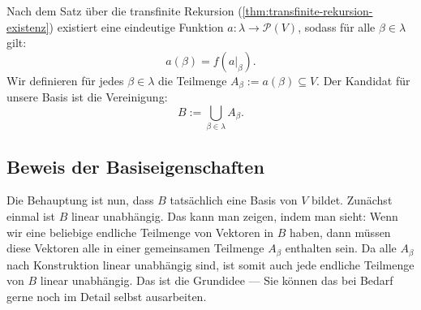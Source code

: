 \begin{math-stroke}
Nach dem Satz über die transfinite Rekursion (\cref{thm:transfinite-rekursion-existenz}) existiert eine eindeutige Funktion $a \colon \lambda \to \mathcal{P}(V)$, sodass für alle $\beta \in \lambda$ gilt:
\[
a(\beta) = f(a|_{\beta}).
\]
Wir definieren für jedes $\beta \in \lambda$ die Teilmenge $A_\beta := a(\beta) \subseteq V$. Der Kandidat für unsere Basis ist die Vereinigung:
\begin{equation}\label{eq:basis-kandidat-actual}
B := \bigcup_{\beta \in \lambda} A_\beta.
\end{equation}
\end{math-stroke}

\subsection{Beweis der Basiseigenschaften}
\begin{spoken-clean}[00:48:05 - 00:50:20]
Die Behauptung ist nun, dass $B$ tatsächlich eine Basis von $V$ bildet. Zunächst einmal ist $B$ linear unabhängig. Das kann man zeigen, indem man sieht: Wenn wir eine beliebige endliche Teilmenge von Vektoren in $B$ haben, dann müssen diese Vektoren alle in einer gemeinsamen Teilmenge $A_\beta$ enthalten sein. Da alle $A_\beta$ nach Konstruktion linear unabhängig sind, ist somit auch jede endliche Teilmenge von $B$ linear unabhängig. Das ist die Grundidee --- Sie können das bei Bedarf gerne noch im Detail selbst ausarbeiten.
\end{spoken-clean}

